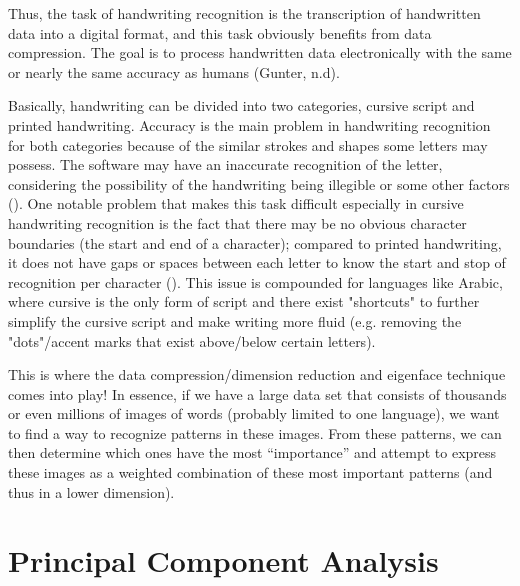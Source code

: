 \documentclass[12pt]{report}
\begin{document}
            Thus, the task of handwriting recognition is the transcription of handwritten data into a digital format, and this task obviously benefits from data compression. The goal is to process handwritten data electronically with the same or nearly the same accuracy as humans (Gunter, n.d).
            
            Basically, handwriting can be divided into two categories, cursive script and printed handwriting. Accuracy is the main problem in handwriting recognition for both categories because of the similar strokes and shapes some letters may possess. The software may have an inaccurate recognition of the letter, considering the possibility of the handwriting being illegible or some other factors (). One notable problem that makes this task difficult especially in cursive handwriting recognition is the fact that there may be no obvious character boundaries (the start and end of a character); compared to printed handwriting, it does not have gaps or spaces between each letter to know the start and stop of recognition per character (). This issue is compounded for languages like Arabic, where cursive is the only form of script and there exist "shortcuts" to further simplify the cursive script and make writing more fluid (e.g. removing the "dots"/accent marks that exist above/below certain letters).
            
            This is where the data compression/dimension reduction and eigenface technique comes into play! In essence, if we have a large data set that consists of thousands or even millions of images of words (probably limited to one language), we want to find a way to recognize patterns in these images. From these patterns, we can then determine which ones have the most “importance” and attempt to express these images as a weighted combination of these most important patterns (and thus in a lower dimension).
        
    
    \chapter{Principal Component Analysis}
\end{document}
